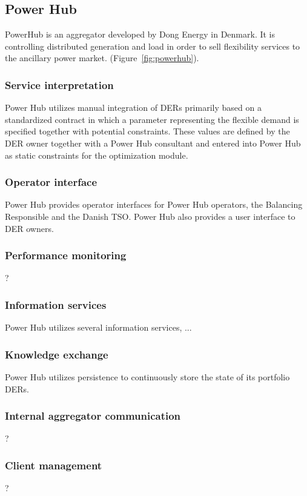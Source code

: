 \subsection{Power Hub}
PowerHub is an aggregator developed by Dong Energy in Denmark. It is controlling distributed generation and load in order to sell flexibility services to the ancillary power market.
(Figure~\ref{fig:powerhub}).
\subsubsection{Service interpretation}
Power Hub utilizes manual integration of DERs primarily based on a standardized contract in which a parameter representing the flexible demand is specified together with potential constraints. These values are defined by the DER owner together with a Power Hub consultant and entered into Power Hub as static constraints for the optimization module.

\subsubsection{Operator interface}
Power Hub provides operator interfaces for Power Hub operators, the Balancing Responsible and the Danish TSO. Power Hub also provides a user interface to DER owners.

\subsubsection{Performance monitoring}
?

\subsubsection{Information services}
Power Hub utilizes several information services, ...   

\subsubsection{Knowledge exchange}
Power Hub utilizes persistence to continuously store the state of its portfolio DERs.

\subsubsection{Internal aggregator communication}
?
\subsubsection{Client management}
?

